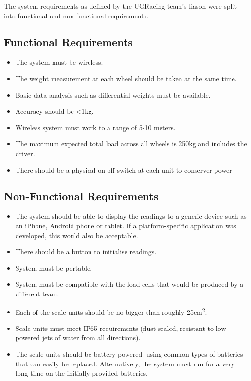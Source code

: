The system requirements as defined by the UGRacing team's liason were split into functional and non-functional requirements.

\subsection{Functional Requirements}
\label{functional}
\begin{itemize}
\item The system must be wireless.
\item The weight measurement at each wheel should be taken at the same time.
\item Basic data analysis such as differential weights must be available.
\item Accuracy should be \textless 1kg.
\item Wireless system must work to a range of 5-10 meters.
\item The maximum expected total load across all wheels is 250kg and includes the driver.
\item There should be a physical on-off switch at each unit to conserver power.
\end{itemize}

\subsection{Non-Functional Requirements}
\label{non-functional}
\begin{itemize}
\item The system should be able to display the readings to a generic device such as an iPhone, Android phone or tablet. If a platform-specific application was developed, this would also be acceptable.
\item There should be a button to initialise readings.
\item System must be portable.
\item System must be compatible with the load cells that would be produced by a different team.
\item Each of the scale units should be no bigger than roughly 25cm\textsuperscript{2}.
\item Scale units must meet IP65 requirements (dust sealed, resistant to low powered jets of water from all directions).
\item The scale units should be battery powered, using common types of batteries that can easily be replaced. Alternatively, the system must run for a very long time on the initially provided batteries.
\end{itemize}
